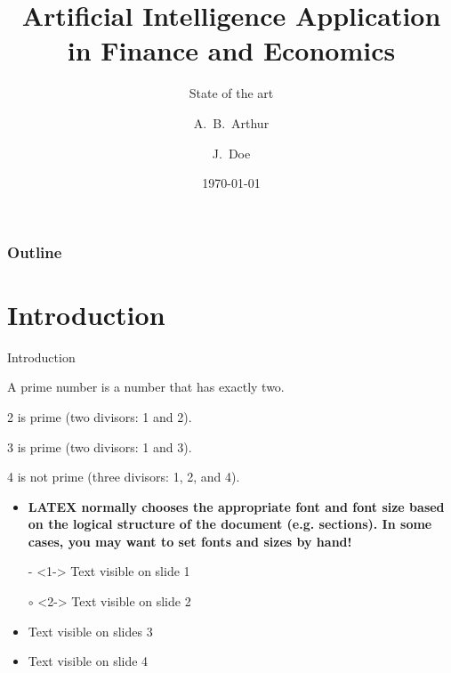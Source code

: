 \documentclass[10pt]{beamer}
\title{Artificial Intelligence Application in Finance and Economics}
\subtitle{State of the art}
\author[Arthur, Doe] %
{A.~B.~Arthur\inst{1} \and J.~Doe\inst{2}}
\institute[VFU] %
{
	\inst{1}%
	Faculty of Physics\\
	Very Famous University
	\and
	\inst{2}%
	Faculty of Chemistry\\
	Very Famous University
}
\date{\today}
\newcommand\Background{%
	\begin{tikzpicture}[remember picture,overlay]
		\node[inner sep=0pt,outer sep=0pt,opacity=0.1]
		at (current page.center)
		{\texttt{[image: img/bg]}};
	\end{tikzpicture}
}
\begin{document}
	\begin{frame}
		\titlepage
	\end{frame}

	\begin{frame}
		\frametitle{Outline}
		\tableofcontents
	\end{frame}

	\section{Introduction}
	\begin{frame}{Introduction}
		\begin{definition}
			\small {A \alert{prime number} is a number that has exactly two.}
		\end{definition}
		
		\begin{example}
			\begin{itemize}
				\small{
				\item 2 is prime (two divisors: 1 and 2).
				\item 3 is prime (two divisors: 1 and 3).
				\item 4 is not prime (\alert{three} divisors: 1, 2, and 4).}
			\end{itemize}
		\end{example}
		\begin{itemize}
			\setbeamertemplate{itemize items}[ball]
			
			\item {\small \bf LATEX normally chooses the appropriate font and font size based on the logical structure of the document (e.g. sections). In some cases, you may want to set fonts and sizes by hand!}
			\item[-]<1-> Text visible on slide 1
			\item[$\circ$]<2-> Text visible on slide 2
			\item<3> Text visible on slides 3
			\item<4-> Text visible on slide 4
		\end{itemize}
	\end{frame}
\end{document}
